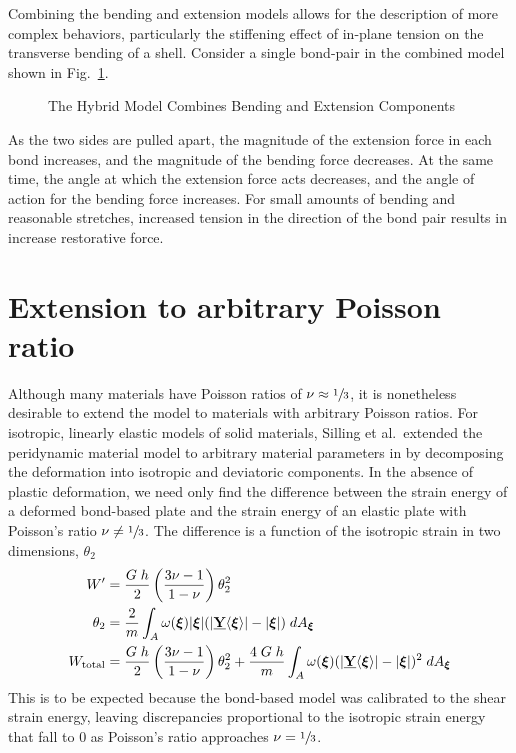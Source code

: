 \documentclass[preprint,review,12pt]{elsarticle}
\newcommand{\diagrampath}{./diagrams}
\newcommand\vstate[3]{%
	\mathbf{\underline{#1}}%
	\ifstrempty{#2}{}{[#2]}%
	\ifstrempty{#3}{}{\langle #3 \rangle}}
\begin{document}
Combining the bending and extension models allows for the description of more complex behaviors, particularly the stiffening effect of in-plane tension on the transverse bending of a shell.  Consider a single bond-pair in the combined model shown in Fig.~\ref{fig:hybridmodel}.
%
\begin{figure}[tbp]
  \centering
  
  \caption{The Hybrid Model Combines Bending and Extension Components}
  \label{fig:hybridmodel}
\end{figure}
%
As the two sides are pulled apart, the magnitude of the extension force in each bond increases, and the magnitude of the bending force decreases.  At the same time, the angle at which the extension force acts decreases, and the angle of action for the bending force increases.  For small amounts of bending and reasonable stretches, increased tension in the direction of the bond pair results in increase restorative force.

\section{Extension to arbitrary Poisson ratio}
\label{sec:arbitrary}
Although many materials have Poisson ratios of \(\nu\approx \sfrac{1}{3}\), it is nonetheless desirable to extend the model to materials with arbitrary Poisson ratios.  For isotropic, linearly elastic models of solid materials, Silling et al.\ extended the peridynamic material model to arbitrary material parameters in \cite{silling2007peridynamic} by decomposing the deformation into isotropic and deviatoric components.  In the absence of plastic deformation, we need only find the difference between the strain energy of a deformed bond-based plate and the strain energy of an elastic plate with Poisson's ratio \(\nu \neq \sfrac{1}{3}\).  The difference is a function of the isotropic strain in two dimensions, \(\theta_2\)
%
\begin{align}
    W' &= \frac{G\;h}{2}\left(\frac{3\nu-1}{1-\nu}\right)\theta_2^2 \notag \\
    \theta_2 &= \frac{2}{m}\int_A \omega(\boldsymbol{\xi})|\boldsymbol{\xi}|(|\vstate{Y}{}{\boldsymbol{\xi}}|-|\boldsymbol{\xi}|)\;dA_{\boldsymbol{\xi}} \notag \\
    W_\text{total} &= \frac{G\;h}{2}\left(\frac{3\nu-1}{1-\nu}\right)\theta_2^2 + \frac{4\;G\;h}{m}\int_A \omega(\boldsymbol{\xi})(|\vstate{Y}{}{\boldsymbol{\xi}}|-|\boldsymbol{\xi}|)^2\;dA_{\boldsymbol{\xi}}\notag
\end{align}
%
This is to be expected because the bond-based model was calibrated to the shear strain energy, leaving discrepancies proportional to the isotropic strain energy that fall to 0 as Poisson's ratio approaches \(\nu = \sfrac{1}{3}\).
\end{document}

